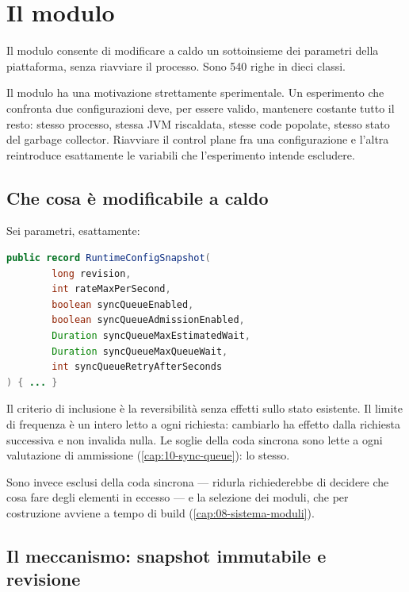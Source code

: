 \chapter{Il modulo }
\label{cap:14-runtime-config}

Il modulo  consente di modificare a caldo un sottoinsieme
dei parametri della piattaforma, senza riavviare il processo. Sono 540 righe in
dieci classi.

Il modulo ha una motivazione strettamente sperimentale. Un esperimento che
confronta due configurazioni deve, per essere valido, mantenere costante tutto il
resto: stesso processo, stessa JVM riscaldata, stesse code popolate, stesso stato
del garbage collector. Riavviare il control plane fra una configurazione e
l'altra reintroduce esattamente le variabili che l'esperimento intende
escludere.

\section{Che cosa \`e modificabile a caldo}

Sei parametri, esattamente:

\begin{lstlisting}[language=Java]
public record RuntimeConfigSnapshot(
        long revision,
        int rateMaxPerSecond,
        boolean syncQueueEnabled,
        boolean syncQueueAdmissionEnabled,
        Duration syncQueueMaxEstimatedWait,
        Duration syncQueueMaxQueueWait,
        int syncQueueRetryAfterSeconds
) { ... }
\end{lstlisting}

Il criterio di inclusione \`e la reversibilit\`a senza effetti sullo stato
esistente. Il limite di frequenza \`e un intero letto a ogni richiesta:
cambiarlo ha effetto dalla richiesta successiva e non invalida nulla. Le soglie
della coda sincrona sono lette a ogni valutazione di ammissione (\cref{cap:10-sync-queue}):
lo stesso.

Sono invece esclusi  della coda sincrona --- ridurla
richiederebbe di decidere che cosa fare degli elementi in eccesso --- e la
selezione dei moduli, che per costruzione avviene a tempo di build
(\cref{cap:08-sistema-moduli}).

\section{Il meccanismo: snapshot immutabile e revisione}

